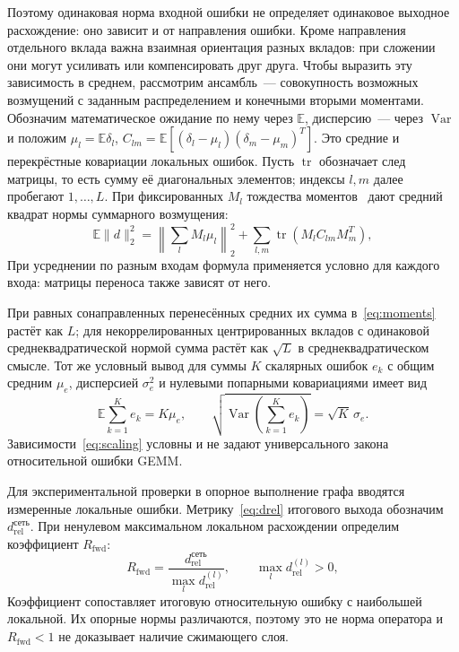 Поэтому одинаковая норма входной ошибки не определяет
одинаковое выходное расхождение: оно зависит и от направления ошибки.
Кроме направления отдельного вклада важна взаимная ориентация разных
вкладов: при сложении они могут усиливать или компенсировать друг друга.
Чтобы выразить эту зависимость в среднем, рассмотрим ансамбль~---
совокупность возможных возмущений с заданным распределением и конечными
вторыми моментами. Обозначим математическое ожидание по нему через
$\mathbb{E}$, дисперсию~--- через $\operatorname{Var}$ и положим
$\mu_l=\mathbb{E}\delta_l$,
$C_{lm}=\mathbb{E}[(\delta_l-\mu_l)(\delta_m-\mu_m)^T]$.
Это средние и перекрёстные ковариации локальных ошибок.
Пусть $\operatorname{tr}$ обозначает след матрицы, то есть сумму
её диагональных элементов; индексы $l,m$ далее пробегают $1,\ldots,L$.
При фиксированных $M_l$ тождества моментов~\cite[разд.~6.2]{Petersen2012}
дают средний квадрат нормы суммарного возмущения:
\begin{equation}
    \label{eq:moments}
    \mathbb{E}\|d\|_2^2=
    \left\|\sum_l M_l\mu_l\right\|_2^2
    +\sum_{l,m}\operatorname{tr}(M_l C_{lm}M_m^T),
\end{equation}
При усреднении по разным входам формула применяется условно
для каждого входа: матрицы переноса также зависят от него.

При равных сонаправленных перенесённых средних их сумма
в~\eqref{eq:moments} растёт как $L$; для некоррелированных центрированных
вкладов с одинаковой среднеквадратической нормой сумма растёт
как $\sqrt L$ в среднеквадратическом смысле.
Тот же условный вывод для суммы $K$ скалярных ошибок $e_k$
с общим средним $\mu_e$, дисперсией $\sigma_e^2$
и нулевыми попарными ковариациями имеет вид
\begin{equation}
    \label{eq:scaling}
    \mathbb{E}\sum_{k=1}^{K}e_k=K\mu_e,\qquad
    \sqrt{\operatorname{Var}\!\left(\sum_{k=1}^{K}e_k\right)}
    =\sqrt K\,\sigma_e.
\end{equation}
Зависимости~\eqref{eq:scaling} условны и не задают универсального закона относительной
ошибки GEMM.

Для экспериментальной проверки в опорное выполнение графа вводятся
измеренные локальные ошибки. Метрику~\eqref{eq:drel} итогового выхода
обозначим $d_{\mathrm{rel}}^{\text{сеть}}$. При ненулевом максимальном
локальном расхождении определим коэффициент $R_{\mathrm{fwd}}$:
\begin{equation}
    \label{eq:ratio}
    R_{\mathrm{fwd}}=
    \frac{d_{\mathrm{rel}}^{\text{сеть}}}
         {\max_l d_{\mathrm{rel}}^{(l)}},\qquad
    \max_l d_{\mathrm{rel}}^{(l)}>0,
\end{equation}
Коэффициент сопоставляет итоговую относительную ошибку с наибольшей
локальной. Их опорные нормы различаются, поэтому это не норма оператора
и $R_{\mathrm{fwd}}<1$ не доказывает наличие сжимающего слоя.

